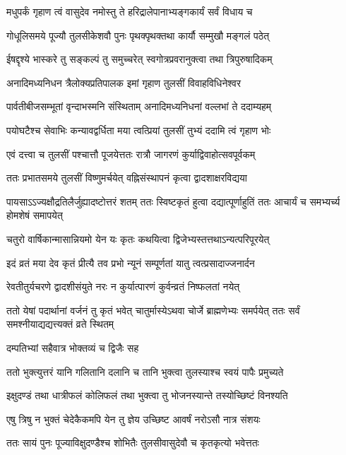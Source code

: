 \twolineshloka
{मधुपर्कं गृहाण त्वं वासुदेव नमोस्तु ते}
{हरिद्रालेपानाभ्यङ्गकार्यं सर्वं विधाय च} %

\twolineshloka
{गोधूलिसमये पूज्यौ तुलसीकेशवौ पुनः}
{पृथक्पृथक्तथा कार्यौ सम्मुखौ मङ्गलं पठेत्} %

\twolineshloka
{ईषद्दृश्ये भास्करे तु सङ्कल्पं तु समुच्चरेत्}
{स्वगोत्रप्रवरानुक्त्वा तथा त्रिपुरुषादिकम्} %

\twolineshloka
{अनादिमध्यनिधन त्रैलोक्यप्रतिपालक}
{इमां गृहाण तुलसीं विवाहविधिनेश्वर} %

\twolineshloka
{पार्वतीबीजसम्भूतां वृन्दाभस्मनि संस्थिताम्}
{अनादिमध्यनिधनां वल्लभां ते ददाम्यहम्} %

\twolineshloka
{पयोघटैश्च सेवाभिः कन्यावद्वर्धिता मया}
{त्वत्प्रियां तुलसीं तुभ्यं ददामि त्वं गृहाण भोः} %

\twolineshloka
{एवं दत्त्वा च तुलसीं पश्चात्तौ पूजयेत्ततः}
{रात्रौ जागरणं कुर्याद्विवाहोत्सवपूर्वकम्} %

\twolineshloka
{ततः प्रभातसमये तुलसीं विष्णुमर्चयेत्}
{वह्निसंस्थापनं कृत्वा द्वादशाक्षरविद्यया} %

\threelineshloka
{पायसाऽऽज्यक्षौद्रतिलैर्जुह्यादष्टोत्तरं शतम्}
{ततः स्विष्टकृतं हुत्वा दद्यात्पूर्णाहुतिं ततः}
{आचार्यं च समभ्यर्च्य होमशेषं समापयेत्} %

\twolineshloka
{चतुरो वार्षिकान्मासान्नियमो येन यः कृतः}
{कथयित्वा द्विजेभ्यस्तत्तथाऽन्यत्परिपूरयेत्} %

\twolineshloka
{इदं व्रतं मया देव कृतं प्रीत्यै तव प्रभो}
{न्यूनं सम्पूर्णतां यातु त्वत्प्रसादाज्जनार्दन} %

\twolineshloka
{रेवतीतुर्यचरणे द्वादशीसंयुते नरः}
{न कुर्यात्पारणं कुर्वन्व्रतं निष्फलतां नयेत्} %

\threelineshloka
{ततो येषां पदार्थानां वर्जनं तु कृतं भवेत्}
{चातुर्मास्येऽथवा चोर्जे ब्राह्मणेभ्यः समर्पयेत्}
{ततः सर्वं समश्नीयाद्यद्यत्त्यक्तं व्रते स्थितम्} %


\onelineshloka
{दम्पतिभ्यां सहैवात्र भोक्तव्यं च द्विजैः सह} %

\twolineshloka
{ततो भुक्त्युत्तरं यानि गलितानि दलानि च}
{तानि भुक्त्वा तुलस्याश्च स्वयं पापैः प्रमुच्यते} %

\twolineshloka
{इक्षुदण्डं तथा धात्रीफलं कोलिफलं तथा}
{भुक्त्वा तु भोजनस्यान्ते तस्योच्छिष्टं विनश्यति} %

\twolineshloka
{एषु त्रिषु न भुक्तं चेदेकैकमपि येन तु}
{ज्ञेय उच्छिष्ट आवर्षं नरोऽसौ नात्र संशयः} %

\twolineshloka
{ततः सायं पुनः पूज्याविक्षुदण्डैश्च शोभितैः}
{तुलसीवासुदेवौ च कृतकृत्यो भवेत्ततः} %

